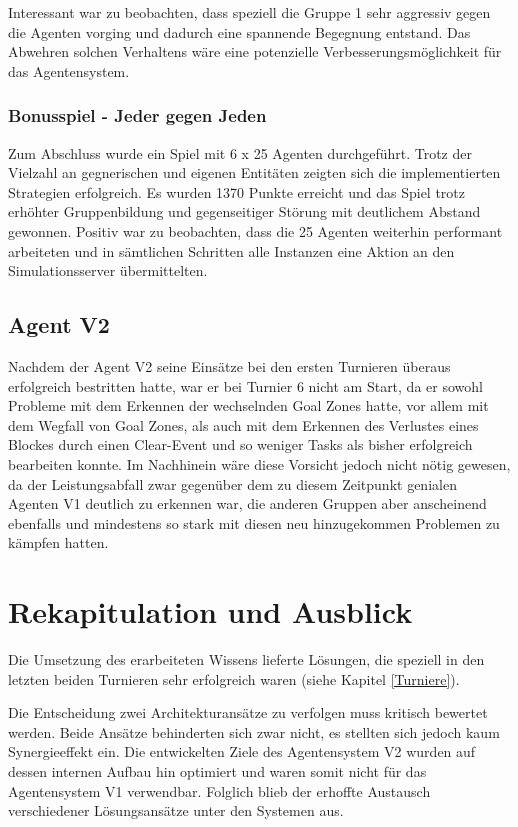 \documentclass[runningheads]{llncs}
\begin{document}
	Interessant war zu beobachten, dass speziell die Gruppe 1 sehr aggressiv gegen die Agenten vorging und dadurch eine spannende Begegnung entstand. Das Abwehren solchen Verhaltens wäre eine potenzielle Verbesserungsmöglichkeit für das Agentensystem. 
	
	\subsubsection{Bonusspiel - Jeder gegen Jeden}
	Zum Abschluss wurde ein Spiel mit 6 x 25 Agenten durchgeführt. Trotz der Vielzahl an gegnerischen und eigenen Entitäten zeigten sich die implementierten Strategien erfolgreich. Es wurden 1370 Punkte erreicht und das Spiel trotz erhöhter Gruppenbildung und gegenseitiger Störung mit deutlichem Abstand gewonnen.
	Positiv war zu beobachten, dass die 25 Agenten weiterhin performant arbeiteten und in sämtlichen Schritten alle Instanzen eine Aktion an den Simulationsserver übermittelten.
	
	\subsection{Agent V2}
	 Nachdem der Agent V2 seine Einsätze bei den ersten Turnieren überaus erfolgreich bestritten hatte, war er bei Turnier 6 nicht am Start, da er sowohl Probleme mit dem Erkennen der wechselnden Goal Zones hatte, vor allem mit dem Wegfall von Goal Zones, als auch mit dem Erkennen des Verlustes eines Blockes durch einen Clear-Event und so weniger Tasks als bisher erfolgreich bearbeiten konnte. Im Nachhinein wäre diese Vorsicht jedoch nicht nötig gewesen, da der Leistungsabfall zwar gegenüber dem zu diesem Zeitpunkt genialen Agenten V1 deutlich zu erkennen war, die anderen Gruppen aber anscheinend ebenfalls und mindestens so stark mit diesen neu hinzugekommen Problemen zu kämpfen hatten.
	
	\section{Rekapitulation und Ausblick}
	Die Umsetzung des erarbeiteten Wissens lieferte Lösungen, die speziell in den letzten beiden Turnieren sehr erfolgreich waren (siehe Kapitel \ref{Turniere}).
	
	
	Die Entscheidung zwei Architekturansätze zu verfolgen muss kritisch bewertet werden. Beide Ansätze behinderten sich zwar nicht, es stellten sich jedoch kaum Synergieeffekt ein. Die entwickelten Ziele des Agentensystem V2 wurden auf dessen internen Aufbau hin optimiert und waren somit nicht für das Agentensystem V1 verwendbar. Folglich blieb der erhoffte Austausch verschiedener Lösungsansätze unter den Systemen aus.
	
\end{document}
